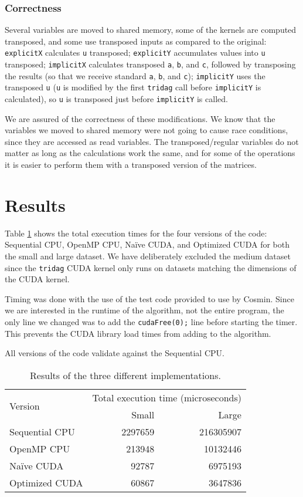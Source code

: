 \documentclass[12pt, oneside]{article}
\begin{document}
\subsubsection{Correctness}
Several variables are moved to shared memory, some of the kernels are computed transposed, and some use transposed inputs as compared to the original: \texttt{explicitX} calculates \texttt{u} transposed; \texttt{explicitY} accumulates values into \texttt{u} transposed; \texttt{implicitX} calculates transposed \texttt{a}, \texttt{b}, and \texttt{c}, followed by transposing the results (so that we receive standard \texttt{a}, \texttt{b}, and \texttt{c}); \texttt{implicitY} uses the transposed \texttt{u} (\texttt{u} is modified by the first \texttt{tridag} call before \texttt{implicitY} is calculated), so \texttt{u} is transposed just before \texttt{implicitY} is called.

We are assured of the correctness of these modifications. We know that the variables we moved to shared memory were not going to cause race conditions, since they are accessed as read variables. The transposed/regular variables do not matter as long as the calculations work the same, and for some of the operations it is easier to perform them with a transposed version of the matrices.
\section{Results}
Table \ref{fig:results} shows the total execution times for the four versions of the code: Sequential CPU, OpenMP CPU, Na\"ive CUDA, and Optimized CUDA for both the small and large dataset. We have deliberately excluded the medium dataset since the \texttt{tridag} CUDA kernel only runs on datasets matching the dimensions of the CUDA kernel.

Timing was done with the use of the test code provided to use by Cosmin. Since we are interested in the runtime of the algorithm, not the entire program, the only line we changed was to add the \texttt{cudaFree(0);} line before starting the timer. This prevents the CUDA library load times from adding to the algorithm.

All versions of the code validate against the Sequential CPU.
\begin{table}[h]
\centering
\begin{tabular}{l r r}
\toprule
\multirow{2}{*}{Version}        & \multicolumn{2}{c}{Total execution time (microseconds)} \\
                    & Small     & Large \\
\midrule
Sequential CPU      & 2297659   & 216305907 \\
OpenMP CPU          & 213948    & 10132446  \\
Na\"ive CUDA        & 92787     & 6975193   \\
Optimized CUDA      & 60867     & 3647836   \\
\bottomrule
\end{tabular}
\caption{\label{fig:results} Results of the three different implementations.}
\end{table}
\end{document}
